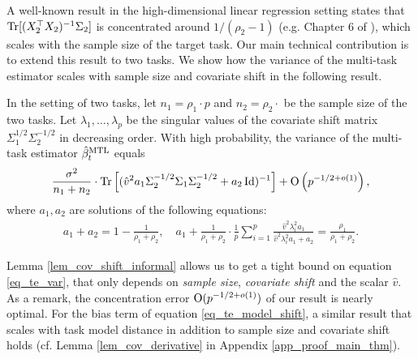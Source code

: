 A well-known result in the high-dimensional linear regression setting states that $\operatorname{Tr}[(X_2^{\top}X_2)^{-1}\Sigma_2]$ is concentrated around $1 / (\rho_2 - 1)$ (e.g. Chapter 6 of \cite{S07}), which scales with the sample size of the target task.
Our main technical contribution is to extend this result to two tasks.
We show how the variance of the multi-task estimator scales with sample size and covariate shift in the following result.
\begin{lemma}\label{lem_cov_shift_informal}
	In the setting of two tasks,
	let $n_1 = \rho_1 \cdot p$ and $n_2 = \rho_2 \cdot$ be the sample size of the two tasks.
	Let $\lambda_1, \dots, \lambda_p$ be the singular values of the covariate shift matrix $\Sigma_1^{1/2}\Sigma_2^{-1/2}$ in decreasing order.
	With high probability, the variance of the multi-task estimator $\hat{\beta}_t^{\text{MTL}}$ equals
	{\small\begin{align*}%
		\frac{\sigma^2}{n_1+n_2}\cdot \bigtr{ (\hat{v}^2 a_1 \Sigma_2^{-1/2}\Sigma_1\Sigma_2^{-1/2} + a_2\id)^{-1}} +\bigo{{p^{-1/2+o(1)}}},
	\end{align*}}%
	where $a_1, a_2$ are solutions of the following equations:
	{\small\begin{align*}
		a_1 + a_2 = 1- \frac{1}{\rho_1 + \rho_2},\quad a_1 + \frac1{\rho_1 + \rho_2}\cdot \frac{1}{p}\sum_{i=1}^p \frac{\hat{v}^2\lambda_i^2 a_1}{\hat{v}^2\lambda_i^2 a_1 + a_2} = \frac{\rho_1}{\rho_1 + \rho_2}.
	\end{align*}}
\end{lemma}
Lemma \ref{lem_cov_shift_informal} allows us to get a tight bound on equation \eqref{eq_te_var}, that only depends on \textit{sample size}, \textit{covariate shift} and the scalar $\hat{v}$.
As a remark, the concentration error $\operatorname{O}(p^{-1/2+o(1)})$ of our result is nearly optimal.
For the bias term of equation \eqref{eq_te_model_shift}, a similar result that scales with task model distance in addition to sample size and covariate shift holds (cf. Lemma \ref{lem_cov_derivative} in Appendix \ref{app_proof_main_thm}).
